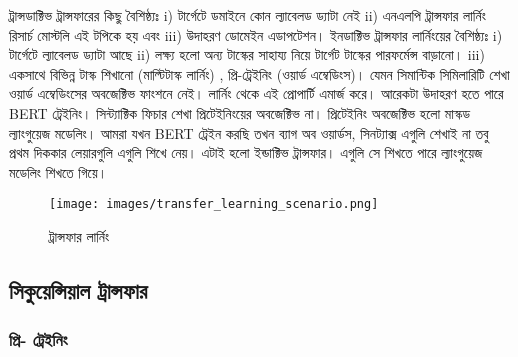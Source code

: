 \documentclass{article}[book]
\begin{document}
ট্রান্সডাক্টিভ ট্রান্সফারের কিছু বৈশিষ্ঠ্যঃ i) টার্গেটে ডমাইনে কোন ল্যাবেলড ড্যাটা নেই ii) এনএলপি ট্রান্সফার লার্নিং রিসার্চ মোস্টলি এই টপিকে হয় এবং   iii) উদাহরণ ডোমেইন এডাপটেশন। ইনডাক্টিভ ট্রান্সফার লার্নিংয়ের বৈশিষ্ঠ্যঃ i) টার্গেটে ল্যাবেলড ড্যাটা আছে ii) লক্ষ্য হলো অন্য টাস্কের সাহায্য নিয়ে টার্গেট টাস্কের পারফর্মেন্স বাড়ানো। iii) একসাথে বিভিন্ন টাস্ক শিখানো (মাল্টিটাস্ক লার্নিং) , প্রি-ট্রেইনিং (ওয়ার্ড এম্বেডিংস)। যেমন সিমান্টিক সিমিলারিটি শেখা ওয়ার্ড এম্বেডিংসের অবজেক্টিভ ফাংশনে নেই। লার্নিং থেকে এই প্রোপার্টি এমার্জ করে। আরেকটা উদাহরণ হতে পারে BERT ট্রেইনিং। সিন্ট্যাক্টিক ফিচার শেখা প্রিটেইনিংয়ের অবজেক্টিভ না। প্রিটেইনিং অবজেক্টিভ হলো মাস্কড ল্যাংগুয়েজ মডেলিং। আমরা যখন BERT ট্রেইন করছি তখন ব্যাগ অব ওয়ার্ডস, সিনট্যাক্স এগুলি শেখাই না তবু প্রথম দিককার লেয়ারগুলি এগুলি শিখে নেয়। এটাই হলো ইন্ডাক্টিভ ট্রান্সফার। এগুলি সে শিখতে পারে ল্যাংগুয়েজ মডেলিং শিখতে গিয়ে।



\begin{figure}[htbp] %
   \centering
   \texttt{[image: images/transfer\_learning\_scenario.png]} 
   \caption{ট্রান্সফার লার্নিং}
   \label{fig:ruder_transfer_learning}
\end{figure} 

\subsection{সিকুয়েন্সিয়াল ট্রান্সফার}

\subsubsection{প্রি- ট্রেইনিং}
\end{document}
